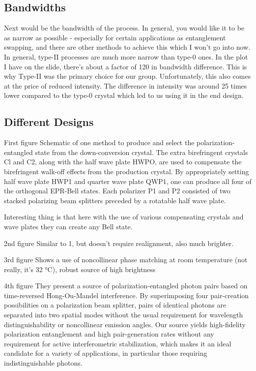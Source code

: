 \documentclass{article}
\theoremstyle{mytheoremstyle}
\theoremstyle{mytheoremstyle}
\theoremstyle{myproblemstyle}
\begin{document}
\subsection{Bandwidths}
Next would be the bandwidth of the process. In general, you would like it to be as narrow as possible - especially for certain
applications as entanglement swapping, and there are other methods to achieve this which I won't go into now. In general,
type-II processes are much more narrow than type-0 ones. In the plot I have on the slide, there's about a factor of 120 in
bandwidth difference. This is why Type-II was the primary choice for our group. Unfortunately, this also comes at the price
of reduced intensity. The difference in intensity was around 25 times lower compared to the type-0 crystal which led to us
using it in the end design.

\subsection{Different Designs}
First figure
Schematic of one method to produce and select the polarization-entangled state from the down-conversion crystal.
The extra birefringent crystals Cl and C2, along with the half wave plate HWPO, are used to compensate the birefringent
walk-off effects from the production crystal. By appropriately setting half wave plate HWP1 and quarter wave plate QWP1,
one can produce all four of the orthogonal EPR-Bell states. Each polarizer P1 and P2 consisted of two stacked polarizing
beam splitters preceded by a rotatable half wave plate.

Interesting thing is that here with the use of various compensating crystals and wave plates they can create any
Bell state.

2nd figure
Similar to 1, but doesn't require realignment, also much brighter.

3rd figure
Shows a use of noncollinear phase matching at room temperature (not really,
it's 32 °C), robust source of high brightness

4th figure
They present a source of polarization-entangled photon pairs based on time-reversed
Hong-Ou-Mandel interference. By superimposing four pair-creation possibilities on a polarization beam
splitter, pairs of identical photons are separated into two spatial modes without the usual requirement for
wavelength distinguishability or noncollinear emission angles. Our source yields high-fidelity polarization entanglement and high pair-generation rates without any requirement for active interferometric
stabilization, which makes it an ideal candidate for a variety of applications, in particular those requiring
indistinguishable photons.
\end{document}
